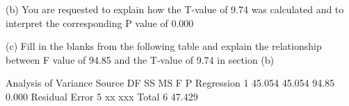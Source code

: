 
(b) 	You are requested to explain how the T-value of 9.74 was calculated and to 
interpret the corresponding P value of 0.000


(c)	Fill in the blanks from the following table and explain the relationship between F value of 94.85 and the T-value of 9.74 in section (b)

Analysis of Variance
Source			DF		SS		MS		F		P
Regression		1		45.054		45.054		94.85		0.000
Residual Error		5		xx		xxx		
Total			6		47.429

















